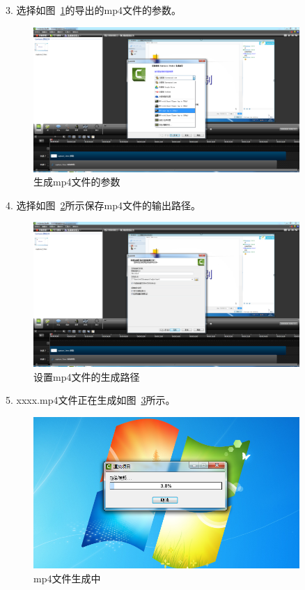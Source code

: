 \documentclass[12pt]{article}
\begin{document}
3. 选择如图~\ref{fig:fig8}的导出的mp4文件的参数。\par
     \begin{figure}
    \centering
    \includegraphics[width=0.9\textwidth]{fig8.png}
    \caption{生成mp4文件的参数}
    \label{fig:fig8}
    \end{figure}
4. 选择如图~\ref{fig:fig9}所示保存mp4文件的输出路径。\par
     \begin{figure}
    \centering
    \includegraphics[width=0.9\textwidth]{fig9.png}
    \caption{设置mp4文件的生成路径}
    \label{fig:fig9}
    \end{figure}
5. xxxx.mp4文件正在生成如图~\ref{fig:fig10}所示。
     \begin{figure}
    \centering
    \includegraphics[width=0.9\textwidth]{fig10.png}
    \caption{mp4文件生成中}
    \label{fig:fig10}
    \end{figure}
\end{document}
